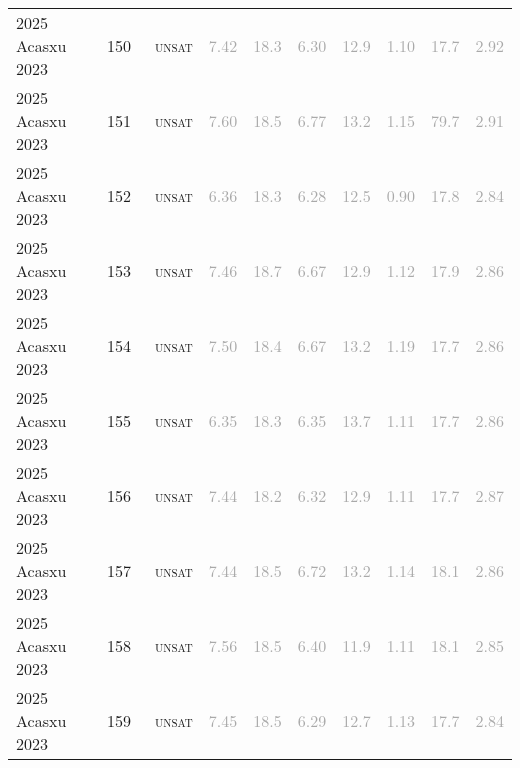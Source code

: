 \begin{center}
{\begin{longtable}{@{}llllllllll@{}}
2025 Acasxu 2023 & 150 & ~\textsc{unsat} & \textcolor{darkgray}{7.42} & \textcolor{darkgray}{18.3} & \textcolor{darkgray}{6.30} & \textcolor{darkgray}{12.9} & \textcolor{darkgray}{1.10} & \textcolor{darkgray}{17.7} & \textcolor{darkgray}{2.92} \\
2025 Acasxu 2023 & 151 & ~\textsc{unsat} & \textcolor{darkgray}{7.60} & \textcolor{darkgray}{18.5} & \textcolor{darkgray}{6.77} & \textcolor{darkgray}{13.2} & \textcolor{darkgray}{1.15} & \textcolor{darkgray}{79.7} & \textcolor{darkgray}{2.91} \\
2025 Acasxu 2023 & 152 & ~\textsc{unsat} & \textcolor{darkgray}{6.36} & \textcolor{darkgray}{18.3} & \textcolor{darkgray}{6.28} & \textcolor{darkgray}{12.5} & \textcolor{darkgray}{0.90} & \textcolor{darkgray}{17.8} & \textcolor{darkgray}{2.84} \\
2025 Acasxu 2023 & 153 & ~\textsc{unsat} & \textcolor{darkgray}{7.46} & \textcolor{darkgray}{18.7} & \textcolor{darkgray}{6.67} & \textcolor{darkgray}{12.9} & \textcolor{darkgray}{1.12} & \textcolor{darkgray}{17.9} & \textcolor{darkgray}{2.86} \\
2025 Acasxu 2023 & 154 & ~\textsc{unsat} & \textcolor{darkgray}{7.50} & \textcolor{darkgray}{18.4} & \textcolor{darkgray}{6.67} & \textcolor{darkgray}{13.2} & \textcolor{darkgray}{1.19} & \textcolor{darkgray}{17.7} & \textcolor{darkgray}{2.86} \\
2025 Acasxu 2023 & 155 & ~\textsc{unsat} & \textcolor{darkgray}{6.35} & \textcolor{darkgray}{18.3} & \textcolor{darkgray}{6.35} & \textcolor{darkgray}{13.7} & \textcolor{darkgray}{1.11} & \textcolor{darkgray}{17.7} & \textcolor{darkgray}{2.86} \\
2025 Acasxu 2023 & 156 & ~\textsc{unsat} & \textcolor{darkgray}{7.44} & \textcolor{darkgray}{18.2} & \textcolor{darkgray}{6.32} & \textcolor{darkgray}{12.9} & \textcolor{darkgray}{1.11} & \textcolor{darkgray}{17.7} & \textcolor{darkgray}{2.87} \\
2025 Acasxu 2023 & 157 & ~\textsc{unsat} & \textcolor{darkgray}{7.44} & \textcolor{darkgray}{18.5} & \textcolor{darkgray}{6.72} & \textcolor{darkgray}{13.2} & \textcolor{darkgray}{1.14} & \textcolor{darkgray}{18.1} & \textcolor{darkgray}{2.86} \\
2025 Acasxu 2023 & 158 & ~\textsc{unsat} & \textcolor{darkgray}{7.56} & \textcolor{darkgray}{18.5} & \textcolor{darkgray}{6.40} & \textcolor{darkgray}{11.9} & \textcolor{darkgray}{1.11} & \textcolor{darkgray}{18.1} & \textcolor{darkgray}{2.85} \\
2025 Acasxu 2023 & 159 & ~\textsc{unsat} & \textcolor{darkgray}{7.45} & \textcolor{darkgray}{18.5} & \textcolor{darkgray}{6.29} & \textcolor{darkgray}{12.7} & \textcolor{darkgray}{1.13} & \textcolor{darkgray}{17.7} & \textcolor{darkgray}{2.84} \\

\end{longtable}}
\end{center}
